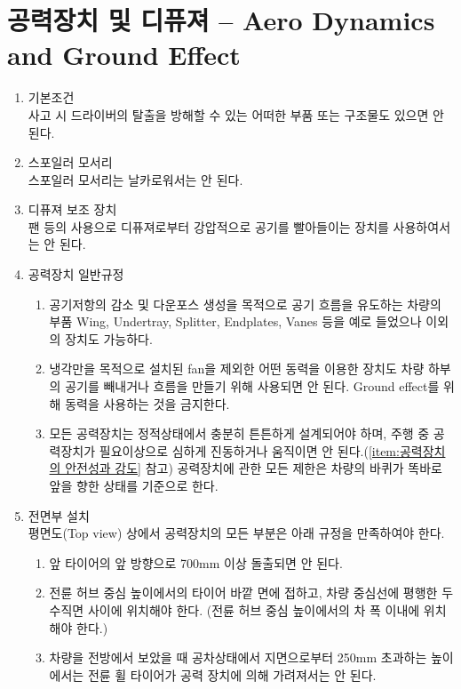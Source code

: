 \documentclass[final,a4paper,10pt]{report}
\begin{document}
\section{공력장치 및 디퓨져 – Aero Dynamics and Ground Effect}
\begin{enumerate}
  \item 기본조건\\
    사고 시 드라이버의 탈출을 방해할 수 있는 어떠한 부품 또는 구조물도 있으면 안 된다.
  \item 스포일러 모서리\\
    스포일러 모서리는 날카로워서는 안 된다.
  \item 디퓨져 보조 장치\\
    팬 등의 사용으로 디퓨져로부터 강압적으로 공기를 빨아들이는 장치를 사용하여서는 안 된다.
    
  \item 공력장치 일반규정  
    \begin{enumerate}
      \item 공기저항의 감소 및 다운포스 생성을 목적으로 공기 흐름을 유도하는 차량의 부품 Wing, Undertray, Splitter, Endplates, Vanes 등을 예로 들었으나 이외의 장치도 가능하다.
      \item 냉각만을 목적으로 설치된 fan을 제외한 어떤 동력을 이용한 장치도 차량 하부의 공기를 빼내거나 흐름을 만들기 위해 사용되면 안 된다. Ground effect를 위해 동력을 사용하는 것을 금지한다.
      \item 모든 공력장치는 정적상태에서 충분히 튼튼하게 설계되어야 하며, 주행 중 공력장치가 필요이상으로 심하게 진동하거나 움직이면 안 된다.(\cref{item:공력장치의 안전성과 강도} 참고) 공력장치에 관한 모든 제한은 차량의 바퀴가 똑바로 앞을 향한 상태를 기준으로 한다.
    \end{enumerate}
    
  
  \item 전면부 설치\\
    평면도(Top view) 상에서 공력장치의 모든 부분은 아래 규정을 만족하여야 한다.
    \begin{enumerate}
      \item 앞 타이어의 앞 방향으로 700mm 이상 돌출되면 안 된다.
      \item 전륜 허브 중심 높이에서의 타이어 바깥 면에 접하고, 차량 중심선에 평행한 두 수직면 사이에 위치해야 한다. (전륜 허브 중심 높이에서의 차 폭 이내에 위치해야 한다.)
      \item 차량을 전방에서 보았을 때 공차상태에서 지면으로부터 250mm 초과하는 높이에서는 전륜 휠 타이어가 공력 장치에 의해 가려져서는 안 된다.
    \end{enumerate}
    

\end{enumerate}
\end{document}

